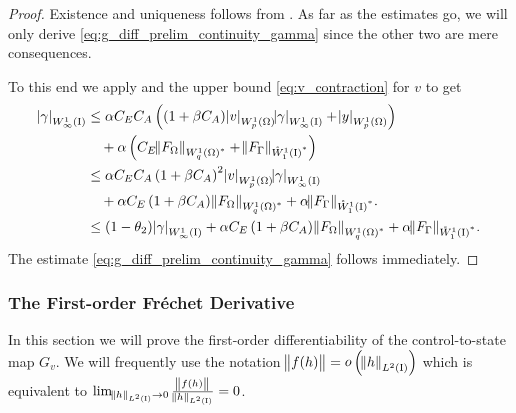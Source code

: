 \documentclass[final]{siamltex}
\begin{document}
\begin{proof}  Existence and uniqueness follows from
  .  As far as the estimates go,  we will only derive \eqref{eq:g_diff_prelim_continuity_gamma} since the other two are mere consequences. 

To this end we apply  and the upper bound \eqref{eq:v_contraction} for $v$ to get
	\begin{align*}
		{\abs{{\gamma}}_{{W^{{1}}_{{\infty}}\del{{\text{\rm I}}}}}} 
			&\leq \alpha C_E C_A\del{\del{1+\beta C_A}{\abs{{v}}_{{W^{{1}}_{{p}}\del{{\Omega}}}}}{\abs{{\gamma}}_{{W^{{1}}_{{\infty}}\del{{\text{\rm I}}}}}} + {\abs{{y}}_{{W^{{1}}_{{p}}\del{{\Omega}}}}}} \\
				&\quad +\alpha \del{C_E{\norm{{F_\Omega}}_{{{W^{{1}}_{{q}}\del{{\Omega}}}}^*}} + {\norm{{F_\Gamma}}_{{{\mathring{W}^{{1}}_{{1}}\del{{{\text{\rm I}}}}}}^*}}} \\
			&\leq \alpha C_E C_A\del{1+\beta C_A}^2{\abs{{v}}_{{W^{{1}}_{{p}}\del{{\Omega}}}}}{\abs{{\gamma}}_{{W^{{1}}_{{\infty}}\del{{\text{\rm I}}}}}} \\
				&\quad + \alpha C_E \del{1+\beta C_A}{\norm{{F_\Omega}}_{{{W^{{1}}_{{q}}\del{{\Omega}}}}^*}} + \alpha{\norm{{F_\Gamma}}_{{{\mathring{W}^{{1}}_{{1}}\del{{{\text{\rm I}}}}}}^*}}. \\
			&\leq \del{1-\theta_2}{\abs{{\gamma}}_{{W^{{1}}_{{\infty}}\del{{\text{\rm I}}}}}} 
				+ \alpha C_E \del{1+\beta C_A}{\norm{{F_\Omega}}_{{{W^{{1}}_{{q}}\del{{\Omega}}}}^*}} + \alpha{\norm{{F_\Gamma}}_{{{\mathring{W}^{{1}}_{{1}}\del{{{\text{\rm I}}}}}}^*}}.
	\end{align*}
The estimate \eqref{eq:g_diff_prelim_continuity_gamma} follows immediately. 
\end{proof}

\subsubsection{The First-order Fr{\'e}chet Derivative}\label{s:g_first_deriv}
In this section we will prove the first-order differentiability of the control-to-state map $G_v$. We will frequently use the notation $\norm{f(h)} = {\mathop{o}\del{{{{\norm{{h}}_{{L^2\del{{{\text{\rm I}}}}}}}}}}}$ which is equivalent to $\lim_{{\norm{{h}}_{{L^2\del{{{\text{\rm I}}}}}}} \rightarrow 0}\frac{\norm{f(h)}}{{\norm{{h}}_{{L^2\del{{{\text{\rm I}}}}}}}} = 0$.
\end{document}
